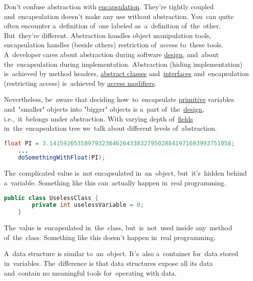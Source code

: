 \warning Don't confuse abstraction with \hyperref[encapsulation]{encapsulation}.
They're tightly coupled and~encapsulation doesn't make any use without abstraction.
You~can quite often encounter a~definition of~one labeled as~a~definition of~the~other.
But~they're different.
Abstraction handles object manipulation tools, encapsulation handles (beside others) restriction of~access to~these tools.
A~developer cares about abstraction during software \hyperref[architecturedesign]{design}, and~about the~encapsulation during implementation.
Abstraction (hiding implementation) is~achieved by method headers, \hyperref[javaabstractclasses]{abstract classes} and~\hyperref[javainterfaces]{interfaces} and~encapsulation (restricting access) is~achieved by \hyperref[javaaccessmodifiers]{access modifiers}.

Nevertheless, be~aware that deciding how~to~encapsulate \hyperref[javadatatypes]{primitive} variables and~"smaller" objects into "bigger" objects is a~part of~the~\hyperref[architecturedesign]{design}, i.e.,~it~belongs under abstraction.
With varying depth of~\hyperref[variablefieldproperty]{fields} in~the~encapsulation tree we~talk about different levels of~abstraction.
\newpage

\begin{lstlisting}[language=Java]
    float PI = 3.1415926535897932384626433832795028841971693993751058;
    ...
    doSomethingWithFloat(PI);
\end{lstlisting}

\noindent The~complicated value is~not encapsulated in~an~object, but~it's~hidden behind a~variable.
Something like this can~actually happen in~real programming.

\begin{lstlisting}[language=Java]
    public class UselessClass {
        private int uselessVariable = 0;
    }
\end{lstlisting}

\noindent The~value is~encapsulated in~the~class, but~is~not~used inside any~method of~the~class.
Something like this doesn't happen in~real programming.
\newline

\label{objectdatastructure}
A~data structure is similar to~an~object.
It's~also a~container for~data stored in~variables.
The~difference is that data structures expose all its data and~contain no meaningful tools for~operating with data.

